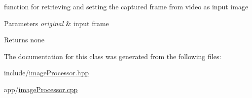 function for retrieving and setting the captured frame from video as input image 


\begin{DoxyParams}{Parameters}
{\em original} & input frame \\
\hline
\end{DoxyParams}
\begin{DoxyReturn}{Returns}
none 
\end{DoxyReturn}


The documentation for this class was generated from the following files\+:\begin{DoxyCompactItemize}
\item 
include/\hyperlink{imageProcessor_8hpp}{image\+Processor.\+hpp}\item 
app/\hyperlink{imageProcessor_8cpp}{image\+Processor.\+cpp}\end{DoxyCompactItemize}
